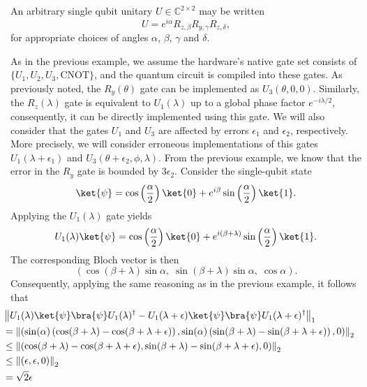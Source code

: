\begin{example}
An arbitrary single qubit unitary $U \in \mathbb{C}^{2 \times 2}$ may be written
\[
U = e^{i\alpha} R_{z,\beta} R_{y,\gamma} R_{z,\delta},
\]
for appropriate choices of angles $\alpha$, $\beta$, $\gamma$ and $\delta$.


As in the previous example, we assume the hardware's native gate set consists of $\{U_1, U_2, U_3, \text{CNOT}\}$, and the quantum circuit is compiled into these gates.  
As previously noted, the $R_y(\theta)$ gate can be implemented as $U_3(\theta, 0, 0)$.  
Similarly, the $R_z(\lambda)$ gate is equivalent to $U_1(\lambda)$ up to a global phase factor $e^{-i\lambda/2}$, consequently, it can be directly implemented using this gate.  
We will also consider that the gates $U_1$ and $U_3$ are affected by errors $\epsilon_1$ and $\epsilon_2$, respectively. 
More precisely, we will consider erroneous implementations of this gates $U_1(\lambda + \epsilon_1)$ and $U_3(\theta + \epsilon_2, \phi, \lambda)$. 
From the previous example, we know that the error in the $R_y$ gate is bounded by $3 \epsilon_2$. 
Consider the single-qubit state
\[
\ket{\psi} = \cos\left(\frac{\alpha}{2}\right)\ket{0} + e^{i\beta}\sin\left(\frac{\alpha}{2}\right)\ket{1}.
\]
Applying the \( U_1(\lambda) \) gate yields
\[
U_1(\lambda)\ket{\psi} = \cos\left(\frac{\alpha}{2}\right)\ket{0} + e^{i(\beta + \lambda)}\sin\left(\frac{\alpha}{2}\right)\ket{1}.
\]
The corresponding Bloch vector is then
\[
\left(\!\cos(\beta + \lambda)\sin\alpha,\; \sin(\beta + \lambda)\sin\alpha,\; \cos\alpha\right).
\]
Consequently, applying the same reasoning as in the previous example, it follows that
\begin{align*}
  & \hspace{-15pt} \tracenorm{U_1(\lambda) \ket{\psi}\bra{\psi} U_1(\lambda)^\dag - U_1(\lambda + \epsilon) \ket{\psi}\bra{\psi}U_1(\lambda + \epsilon)^\dag } \\
  & \hspace{-15pt} = \euclideannorm{\left(\sin(\alpha) \left( \cos(\beta + \lambda) -  \cos(\beta + \lambda + \epsilon) \right),\sin(\alpha) \left( \sin(\beta + \lambda) -  \sin(\beta + \lambda + \epsilon) \right),0 \right)} \\
  & \hspace{-15pt}\leq \euclideannorm{\left( \cos(\beta + \lambda) -  \cos(\beta + \lambda + \epsilon) , \sin(\beta + \lambda) -  \sin(\beta + \lambda + \epsilon) ,0 \right)} \\
  & \hspace{-15pt} \leq \euclideannorm{\left( \epsilon, \epsilon ,0 \right)} \\
  & \hspace{-15pt} = \sqrt{2}\epsilon 
\end{align*} 


\end{example}
